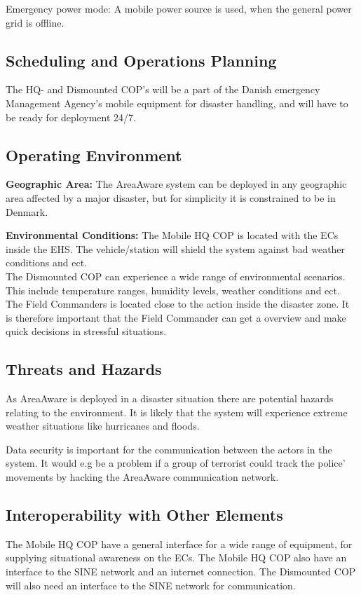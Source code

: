 \noindent Emergency power mode: A mobile power source is used, when the general power grid is offline.\\

\subsection{Scheduling and Operations Planning}
The HQ- and Dismounted COP’s will be a part of the Danish emergency Management Agency’s mobile equipment for disaster handling, and will have to be ready for deployment 24/7.

\subsection{Operating Environment}
\noindent \textbf{Geographic Area:}
The AreaAware system can be deployed in any geographic area affected by a major disaster, but for simplicity it is constrained to be in Denmark.

\noindent \textbf{Environmental Conditions:}
The Mobile HQ COP is located with the ECs inside the EHS. The vehicle/station will shield the system against bad weather conditions and ect. \\

The Dismounted COP can experience a wide range of environmental scenarios. This include temperature ranges, humidity levels, weather conditions and ect. The Field Commanders is located close to the action inside the disaster zone. It is therefore important that the Field Commander can get a overview and make quick decisions in stressful situations.

\subsection{Threats and Hazards}
As AreaAware is deployed in a disaster situation there are potential hazards relating to the environment. It is likely that the system will experience extreme weather situations like hurricanes and floods.

Data security is important for the communication between the actors in the system. It would e.g be a problem if a group of terrorist could track the police’ movements by hacking the AreaAware communication network.

\subsection{Interoperability with Other Elements}
The Mobile HQ COP have a general interface for a wide range of equipment, for supplying situational awareness on the ECs. The Mobile HQ COP also have an interface to the SINE network and an internet connection. The Dismounted COP will also need an interface to the SINE network for communication.

